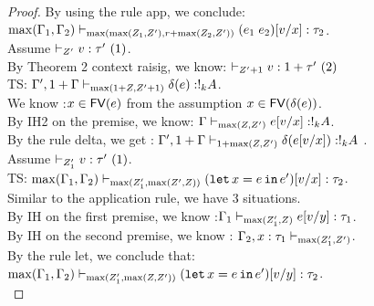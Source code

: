 \begin{proof}
By using the rule app, we conclude:\\
  $\max (\Gamma_1, \Gamma_2 ) \vdash_{ \max(\max(
     Z_1,Z') , r+\max(Z_2, Z') ) } (e_1 \; e_2)[v/x] : \tau_2$.\\

  Assume  $\empty  \tvdash{\nnatA'} \valr : \type' ~(1) $.\\
   By Theorem 2 context raisig, we know: $ \empty \tvdash{\nnatA'+1} \valr : 1+\type' ~(2) $\\
   TS:
   $\Gamma' ,1+\Gamma \vdash_{ \max( 1+Z, Z'+1)  }
   \delta(e): !_{k} A $.\\
   We know :$ x \in \mathsf{FV} (e)$ from the assumption $ x \in \mathsf{FV} (\delta{(e)})$.\\
   By IH2 on the premise, we know: $ \Gamma
   \vdash_{\max(Z,Z')} e[v/x]: !_{k} A $.\\
   By the rule delta, we get :
      $\Gamma' ,1+\Gamma \vdash_{1+ \max( Z, Z')  } \delta(e[v/x]): !_{k} A $
.\\
  
Assume  $\empty \tvdash{\nnatA_1'} \valr : \type' ~(1) $.\\
   TS:   $\max (\Gamma_1, \Gamma_2 ) \vdash_{ \max(
     Z_1' , \max(Z', Z) ) } ( \mathop{\mathtt{let}} x =  e \mathop{ \mathtt{in}} e' )[v/x] : \tau_2$.\\
   Similar to the application rule, we have 3 situations.\\
   By IH on the first premise, we know :$\Gamma_1
   \vdash_{\max(Z_1', Z )}  e[v/y] : \tau_1  $. \\
   By IH on the second premise, we know : $ \Gamma_2, x: \tau_1
   \vdash_{\max(Z_1', Z'  )} $.\\
   By the rule let, we conclude that: \\
    $\max (\Gamma_1, \Gamma_2 ) \vdash_{ \max(
     Z_1' , \max(Z, Z') ) } (\mathop{\mathtt{let}} x =  e \mathop{ \mathtt{in}} e')[v/y] : \tau_2$.\\


\end{proof}
